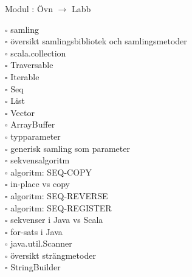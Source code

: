 
    Modul : Övn  $\rightarrow$ Labb 
    \begin{multicols}{3}\SlideFontTiny
    $\square$ samling \\
$\square$ översikt samlingsbibliotek och samlingsmetoder \\
$\square$ scala.collection \\
$\square$ Traversable \\
$\square$ Iterable \\
$\square$ Seq \\
$\square$ List \\
$\square$ Vector \\
$\square$ ArrayBuffer \\
$\square$ typparameter \\
$\square$ generisk samling som parameter \\
$\square$ sekvensalgoritm \\
$\square$ algoritm: SEQ-COPY \\
$\square$ in-place vs copy \\
$\square$ algoritm: SEQ-REVERSE \\
$\square$ algoritm: SEQ-REGISTER \\
$\square$ sekvenser i Java vs Scala \\
$\square$ for-sats i Java \\
$\square$ java.util.Scanner \\
$\square$ översikt strängmetoder \\
$\square$ StringBuilder \\
    \end{multicols}
    